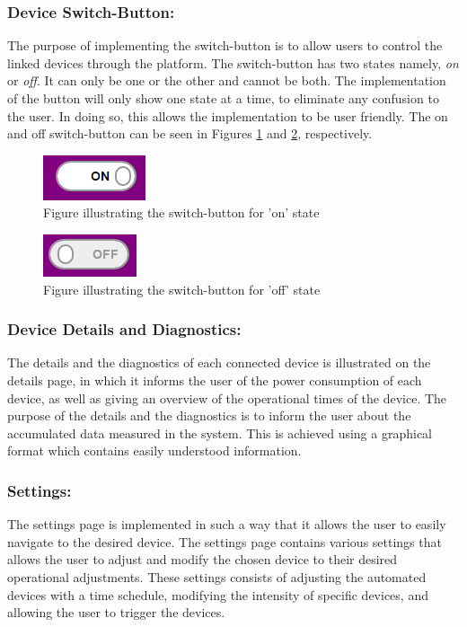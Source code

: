 \documentclass[10pt,twocolumn]{witseiepaper}
\begin{document}
	\subsubsection{Device Switch-Button:}
	The purpose of implementing the switch-button is to allow users to control the linked devices through the platform. The switch-button has two states namely, \textit{on} or \textit{off}. It can only be one or the other and cannot be both. The implementation of the button will only show one state at a time, to eliminate any confusion to the user. In doing so, this allows the implementation to be user friendly. The on and off switch-button can be seen in Figures \ref{on_switch_button} and  \ref{off_switch_button}, respectively.
	
	\begin{figure}[!h]
		\centering
		\includegraphics[scale=0.35]{switch_button.png}
		\caption{Figure illustrating the switch-button for 'on' state}
		\label{on_switch_button}
	\end{figure}
	
	\begin{figure}[!h]
		\centering
		\includegraphics[scale=0.35]{switch_button_off.png}
		\caption{Figure illustrating the switch-button for 'off' state}
		\label{off_switch_button}
	\end{figure}
	
	\subsubsection{Device Details and Diagnostics:}
	The details and the diagnostics of each connected device is illustrated on the details page, in which it informs the user of the power consumption of each device, as well as giving an overview of the operational times of the device. The purpose of the details and the diagnostics is to inform the user about the accumulated data measured in the system. This is achieved using a graphical format which contains easily understood information. 
	
	\subsubsection{Settings:}
	The settings page is implemented in such a way that it allows the user to easily navigate to the desired device. The settings page contains various settings that allows the user to adjust and modify the chosen device to their desired operational adjustments. These settings consists of adjusting the automated devices with a time schedule, modifying the intensity of specific devices, and allowing the user to trigger the devices. 
	
\end{document}
